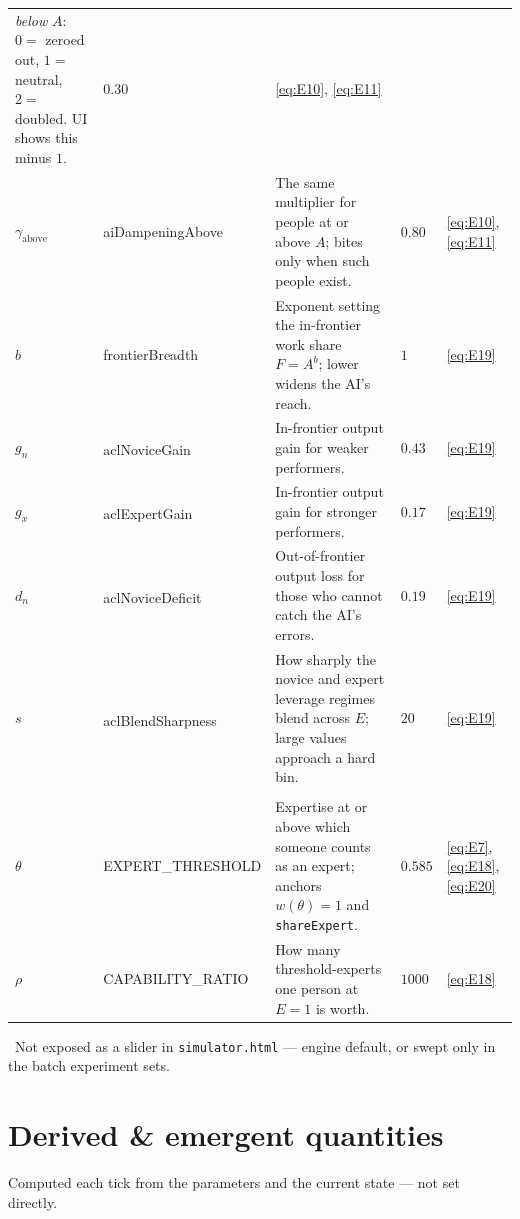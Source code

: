 \documentclass[11pt]{article}
\newcommand{\eqn}[1]{\eqref{eq:#1}}
\newcommand{\dg}{\textsuperscript{\dag}}
\begin{document}
\begin{longtable}{L{1.6cm} K{2.9cm} L{6.8cm} S{2.5cm} S{2.0cm}}
  \emph{below} $A$: $0 = $ zeroed out, $1 = $ neutral, $2 = $ doubled. UI shows
  this minus $1$.
  & $0.30$ & \eqn{E10}, \eqn{E11} \\
$\gamma_{\text{above}}$ & aiDampeningAbove & The same multiplier for people at or
  above $A$; bites only when such people exist.
  & $0.80$ & \eqn{E10}, \eqn{E11} \\
$b$ & frontierBreadth & Exponent setting the in-frontier work share $F = A^{b}$;
  lower widens the AI's reach.
  & $1$ & \eqn{E19} \\
$g_n$ & aclNoviceGain\dg & In-frontier output gain for weaker performers.
  & $0.43$ & \eqn{E19} \\
$g_x$ & aclExpertGain\dg & In-frontier output gain for stronger performers.
  & $0.17$ & \eqn{E19} \\
$d_n$ & aclNoviceDeficit\dg & Out-of-frontier output loss for those who cannot
  catch the AI's errors.
  & $0.19$ & \eqn{E19} \\
$s$ & aclBlendSharpness\dg & How sharply the novice and expert leverage regimes
  blend across $E$; large values approach a hard bin.
  & $20$ & \eqn{E19} \\
\addlinespace
{}\\[2pt]
$\theta$ & EXPERT\_THRESHOLD & Expertise at or above which someone counts as an
  expert; anchors $w(\theta) = 1$ and \texttt{shareExpert}.
  & $0.585$ & \eqn{E7}, \eqn{E18}, \eqn{E20} \\
$\rho$ & CAPABILITY\_RATIO & How many threshold-experts one person at $E = 1$ is
  worth.
  & $1000$ & \eqn{E18} \\
\end{longtable}

\normalsize
{\footnotesize\noindent\dag\ Not exposed as a slider in \texttt{simulator.html}
--- engine default, or swept only in the batch experiment sets.\par}

\section{Derived \& emergent quantities}

\noindent Computed each tick from the parameters and the current state --- not
set directly.
\end{document}
